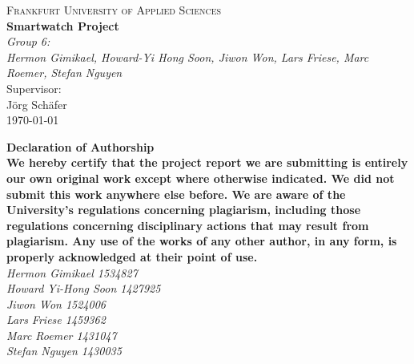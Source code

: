 \documentclass{article}
\begin{document}
\begin{titlepage}
    \centering
    \vspace*{0cm}
    {\scshape\Large Frankfurt University of Applied Sciences}\\[3cm]
    {\huge\bfseries Smartwatch Project}\\[8cm]
    {\Large\itshape Group 6:}\\
    {\Large\itshape Hermon Gimikael, Howard-Yi Hong Soon, Jiwon Won, Lars Friese, Marc Roemer, Stefan Nguyen}\\[4cm]
    Supervisor:\\
    Jörg Schäfer\\[3cm]
    {\large \today}
\end{titlepage}

\begin{center}
    {\huge \textbf{Declaration of Authorship}\\}\vspace{15pt}
	{\normalsize \textbf{We hereby certify that the project report we are submitting is entirely our own original work except where otherwise indicated. We did not submit this work anywhere else before. We are aware of the University's regulations concerning plagiarism, including those regulations concerning disciplinary actions that may result from plagiarism. Any use of the works of any other author, in any form, is properly acknowledged at their point of use.}\\}\vspace{15pt}
	{\normalsize \itshape{Hermon Gimikael 1534827}\\}
	{\normalsize \itshape{Howard Yi-Hong Soon 1427925}\\}
	{\normalsize \itshape{Jiwon Won 1524006}\\}
	{\normalsize \itshape{Lars Friese 1459362}\\}
	{\normalsize \itshape{Marc Roemer 1431047}\\}
	{\normalsize \itshape{Stefan Nguyen 1430035}\\}
\end{center}
\clearpage

\tableofcontents
\newpage

\end{document}
